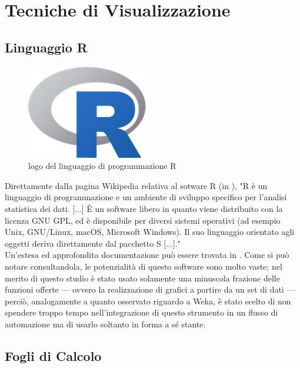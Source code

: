 \section{Tecniche di Visualizzazione}

    \subsection{Linguaggio R}

        \begin{figure}
            \centering
            \caption{logo del linguaggio di programmazione R}
            \label{R}
    	    \includegraphics[scale=0.70]{img/R.png}
        \end{figure}

        Direttamente dalla pagina Wikipedia relativa al sotware R (in \cite{Rwiki}), "R è un linguaggio di programmazione e un ambiente di sviluppo specifico per l'analisi statistica dei dati. [...] È un software libero in quanto viene distribuito con la licenza GNU GPL, ed è disponibile per diversi sistemi operativi (ad esempio Unix, GNU/Linux, macOS, Microsoft Windows). Il suo linguaggio orientato agli oggetti deriva direttamente dal pacchetto S [...]." \\

        Un'estesa ed approfondita documentazione può essere trovata in \cite{R}. Come si può notare consultandola, le potenzialità di questo software sono molto vaste; nel merito di questo studio è stato usato solamente una minuscola frazione delle funzioni offerte --- ovvero la realizzazione di grafici a partire da un set di dati --- perciò, analogamente a quanto osservato riguardo a Weka, è stato scelto di non spendere troppo tempo nell'integrazione di questo strumento in un flusso di automazione ma di usarlo soltanto in forma a sé stante.\\

    \subsection{Fogli di Calcolo}

